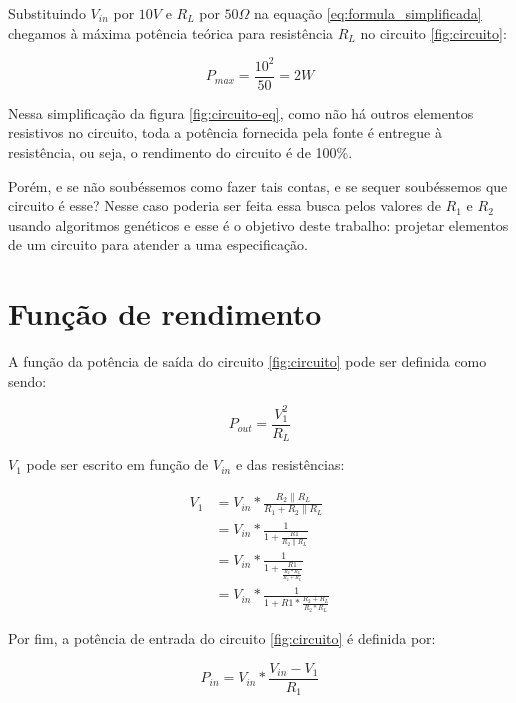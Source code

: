 \documentclass[12pt]{article}
\begin{document}
Substituindo $V_{in}$ por $10V$ e $R_L$ por $50\Omega$ na equação \ref{eq:formula_simplificada} chegamos à máxima potência teórica para  resistência $R_L$ no circuito \ref{fig:circuito}:

\begin{equation}
    \label{eq:potencia_teorica}
    P_{max} = \frac{10^2}{50} = 2W
\end{equation}

Nessa simplificação da figura \ref{fig:circuito-eq}, como não há outros elementos resistivos no circuito, toda a potência fornecida pela fonte é entregue à resistência, ou seja, o rendimento do circuito é de 100\%.

Porém, e se não soubéssemos como fazer tais contas, e se sequer soubéssemos que circuito é esse? Nesse caso poderia ser feita essa busca pelos valores de $R_1$ e $R_2$ usando algoritmos genéticos e esse é o objetivo deste trabalho: projetar elementos de um circuito para atender a uma especificação.

\section{Função de rendimento}
\label{cap:equacionament}

A função da potência de saída do circuito \ref{fig:circuito} pode ser definida como sendo:

\begin{equation}
    \label{eq:pout}
    P_{out} = \frac{V_1^2}{R_L}
\end{equation}

$V_1$ pode ser escrito em função de $V_{in}$ e das resistências:

\begin{equation}
    \label{eq:v1}
    \begin{split}
        V_1 & = V_{in} * \frac{R_2\parallel R_L}{R_1 + R_2\parallel R_L} \\
        & = V_{in} * \frac{1}{1 + \frac{R1}{R_2\parallel R_L}} \\
        & = V_{in} * \frac{1}{1 + \frac{R1}{\frac{R_2 * R_L}{R_2 + R_L} }} \\
        & = V_{in} * \frac{1}{1 + R1 * \frac{R_2 + R_L}{R_2 * R_L} }
    \end{split}
\end{equation}

Por fim, a potência de entrada do circuito \ref{fig:circuito} é definida por:

\begin{equation}
    \label{eq:pin}
    P_{in} = V_{in} * \frac{V_{in} - V_1}{R_1}
\end{equation}
\end{document}
